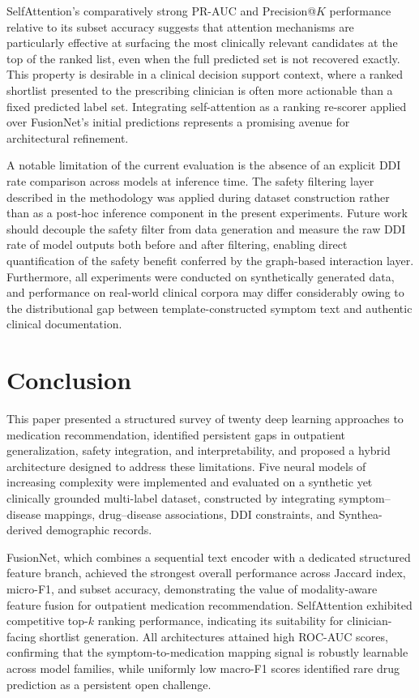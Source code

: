 SelfAttention's comparatively strong PR-AUC and Precision@$K$ performance relative to its subset accuracy suggests that attention mechanisms are particularly effective at surfacing the most clinically relevant candidates at the top of the ranked list, even when the full predicted set is not recovered exactly. This property is desirable in a clinical decision support context, where a ranked shortlist presented to the prescribing clinician is often more actionable than a fixed predicted label set. Integrating self-attention as a ranking re-scorer applied over FusionNet's initial predictions represents a promising avenue for architectural refinement.

A notable limitation of the current evaluation is the absence of an explicit DDI rate comparison across models at inference time. The safety filtering layer described in the methodology was applied during dataset construction rather than as a post-hoc inference component in the present experiments. Future work should decouple the safety filter from data generation and measure the raw DDI rate of model outputs both before and after filtering, enabling direct quantification of the safety benefit conferred by the graph-based interaction layer. Furthermore, all experiments were conducted on synthetically generated data, and performance on real-world clinical corpora may differ considerably owing to the distributional gap between template-constructed symptom text and authentic clinical documentation.

\section{Conclusion}

This paper presented a structured survey of twenty deep learning approaches to medication recommendation, identified persistent gaps in outpatient generalization, safety integration, and interpretability, and proposed a hybrid architecture designed to address these limitations. Five neural models of increasing complexity were implemented and evaluated on a synthetic yet clinically grounded multi-label dataset, constructed by integrating symptom--disease mappings, drug--disease associations, DDI constraints, and Synthea-derived demographic records.

FusionNet, which combines a sequential text encoder with a dedicated structured feature branch, achieved the strongest overall performance across Jaccard index, micro-F1, and subset accuracy, demonstrating the value of modality-aware feature fusion for outpatient medication recommendation. SelfAttention exhibited competitive top-$k$ ranking performance, indicating its suitability for clinician-facing shortlist generation. All architectures attained high ROC-AUC scores, confirming that the symptom-to-medication mapping signal is robustly learnable across model families, while uniformly low macro-F1 scores identified rare drug prediction as a persistent open challenge.

